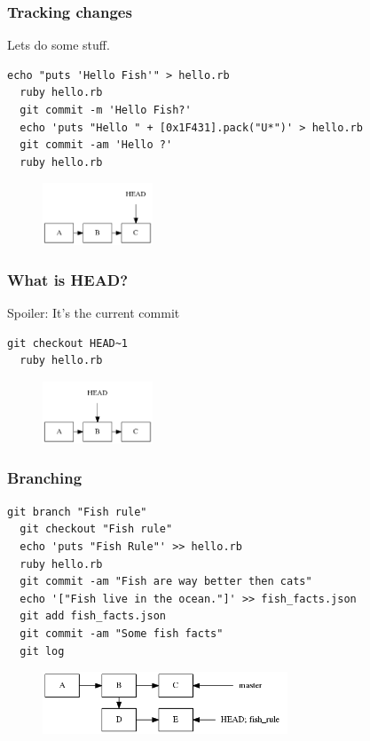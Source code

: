 \documentclass{beamer}
\begin{document}
\begin{frame}[fragile]
\frametitle{Tracking changes}

Lets do some stuff.

\vspace{1em}

\begin{lstlisting}[frame=single]
  echo "puts 'Hello Fish'" > hello.rb
  ruby hello.rb
  git commit -m 'Hello Fish?'
  echo 'puts "Hello " + [0x1F431].pack("U*")' > hello.rb
  git commit -am 'Hello ?'
  ruby hello.rb
\end{lstlisting}

\begin{figure}[p]
  \centering
  \includegraphics[height=5em]{some_commits.png}
\end{figure}

\end{frame}

\begin{frame}[fragile]
\frametitle{What is HEAD?}

Spoiler: It's the current commit

\vspace{1em}

\begin{lstlisting}[frame=single]
  git checkout HEAD~1
  ruby hello.rb
\end{lstlisting}

\begin{figure}[p]
  \centering
  \includegraphics[height=5em]{head.png}
\end{figure}

\end{frame}

\begin{frame}[fragile]
\frametitle{Branching}

\begin{lstlisting}[frame=single]
  git branch "Fish rule"
  git checkout "Fish rule"
  echo 'puts "Fish Rule"' >> hello.rb
  ruby hello.rb
  git commit -am "Fish are way better then cats"
  echo '["Fish live in the ocean."]' >> fish_facts.json
  git add fish_facts.json
  git commit -am "Some fish facts"
  git log
\end{lstlisting}

\begin{figure}[p]
  \centering
  \includegraphics[height=5em]{fish.png}
\end{figure}

\end{frame}
\end{document}
